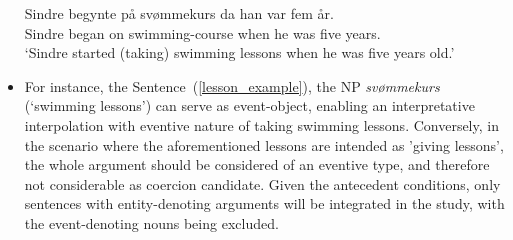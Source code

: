 \documentclass{article}
\newcommand{\pref}[1]{(\ref{#1})} %
\begin{document}
\begin{itemize}
        \ea \label{lesson_example} %
        \gll  Sindre begynte på svømmekurs da han var fem år.\\
            Sindre began on {swimming-course} when he was five years.\\
        \glt ‘Sindre started (taking) swimming lessons when he was five years old.’
        \z
    \item[] For instance, the Sentence~\pref{lesson_example}, the NP \emph{svømmekurs} (`swimming lessons') %
can serve as event-object, enabling an interpretative interpolation with eventive nature of taking swimming lessons.
Conversely, in the scenario where the aforementioned lessons are intended as 'giving lessons', the whole argument should be considered of an eventive type, and therefore not considerable as coercion candidate. Given the antecedent conditions, only sentences with entity-denoting arguments will be integrated in the study, with the event-denoting nouns being excluded.


        \end{itemize}



    









\end{document}
